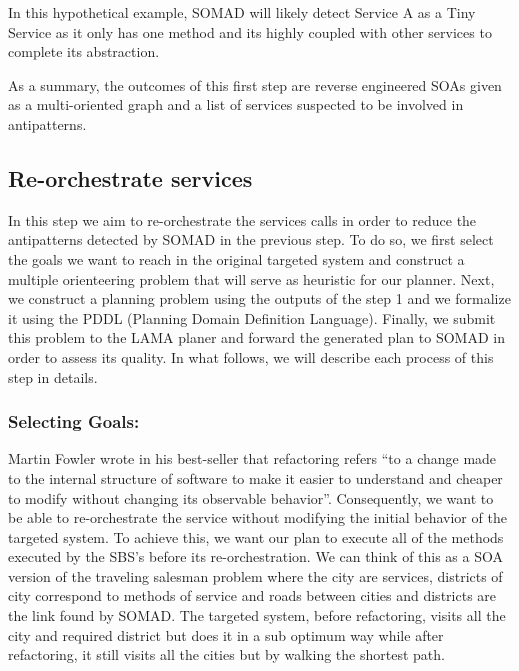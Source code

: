\documentclass[lnbip]{svmultln}
\begin{document}
In this hypothetical example, SOMAD will likely detect Service A as a Tiny Service as it only has one method and its highly coupled with other services to complete its abstraction. 

As a summary, the outcomes of this first step are reverse engineered SOAs given as a multi-oriented graph and a list of services suspected to be involved in antipatterns.

\subsection{Re-orchestrate services}

In this step we aim to re-orchestrate the services calls in order to reduce the antipatterns detected by SOMAD in the previous step. To do so, we first select the goals we want to reach in the original targeted system and construct a multiple orienteering problem that will serve as heuristic for our planner. Next, we construct a planning problem using the outputs of the step 1 and we formalize it using the PDDL (Planning Domain Definition Language). Finally, we submit this problem to the LAMA \cite{richter2010lama} planer and forward the generated plan to SOMAD in order to assess its quality. In what follows, we will describe each process of this step in details.

\subsubsection{Selecting Goals: }Martin Fowler wrote in his best-seller \cite{Fowler1999} that refactoring refers “to a change made to the internal structure of software to make it easier to understand and cheaper to modify without changing its observable behavior”. Consequently, we want to be able to re-orchestrate the service without modifying the initial behavior of the targeted system. To achieve this, we want our plan to execute all of the methods executed by the SBS’s before its re-orchestration. We can think of this as a SOA version of the traveling salesman problem where the city are services, districts of city correspond to methods of service and roads between cities and districts are the link found by SOMAD. The targeted system, before refactoring, visits all the city and required district but does it in a sub optimum way while after refactoring, it still visits all the cities but by walking the shortest path. 
\end{document}
